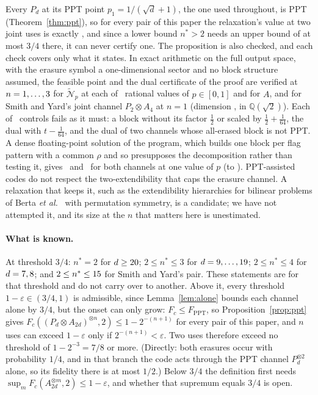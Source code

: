 \documentclass[aps,pra,twocolumn,superscriptaddress,nofootinbib,longbibliography,floatfix]{revtex4-2}
\newcommand{\nt}{\widetilde{\mathcal N}}
\begin{document}
\noindent Every $P_d$ at its PPT point $p_1=1/(\sqrt d+1)$, the one used throughout, is PPT (Theorem~\ref{thm:ppt}), so for every pair of this paper the relaxation's value at two joint uses is exactly \PptTwo, and since a lower bound $n^*>2$ needs an upper bound of at most $3/4$ there, it can never certify one. The proposition is also checked, and each check covers only what it states. In exact arithmetic on the full output space, with the erasure symbol a one-dimensional sector and no block structure assumed, the feasible point and the dual certificate of the proof are verified at $n=1,\dots,3$ for $\nt_p$ at each of \PptPs\ rational values of $p\in[0,1]$ and for $A$, and for Smith and Yard's joint channel $P_2\otimes A_4$ at $n=1$ (dimension \PptJointDim, in $\mathbb Q(\sqrt2)$). Each of \PptControls\ controls fails as it must: a block without its factor $\frac12$ or scaled by $\frac12+\frac1{64}$, the dual with $t-\frac1{64}$, and the dual of two channels whose all-erased block is not PPT. A dense floating-point solution of the program, which builds one block per flag pattern with a common $\rho$ and so presupposes the decomposition rather than testing it, gives \PptOne\ and \PptTwo\ for both channels at one value of $p$ (to \PptProbeDev). PPT-assisted codes do not respect the two-extendibility that caps the erasure channel. A relaxation that keeps it, such as the extendibility hierarchies for bilinear problems of Berta \textit{et al.}~\cite{berta2022semidefinite} with permutation symmetry, is a candidate; we have not attempted it, and its size at the $n$ that matters here is unestimated.

\paragraph*{What is known.} At threshold $3/4$: $n^*=2$ for $d\ge20$; $2\le n^*\le3$ for $d=9,\dots,19$; $2\le n^*\le4$ for $d=7,8$; and $2\le n^*\le15$ for Smith and Yard's pair. These statements are for that threshold and do not carry over to another. Above it, every threshold $1-\varepsilon\in(3/4,1)$ is admissible, since Lemma~\ref{lem:alone} bounds each channel alone by $3/4$, but the onset can only grow: $F_c\le F_{\mathrm{PPT}}$, so Proposition~\ref{prop:ppt} gives $F_c((P_d\otimes A_{2d})^{\otimes n},2)\le1-2^{-(n+1)}$ for every pair of this paper, and $n$ uses can exceed $1-\varepsilon$ only if $2^{-(n+1)}<\varepsilon$. Two uses therefore exceed no threshold of $1-2^{-3}=7/8$ or more. (Directly: both erasures occur with probability $1/4$, and in that branch the code acts through the PPT channel $P_d^{\otimes2}$ alone, so its fidelity there is at most $1/2$.) Below $3/4$ the definition first needs $\sup_mF_c(A_{2d}^{\otimes m},2)\le1-\varepsilon$, and whether that supremum equals $3/4$ is open.
\end{document}
